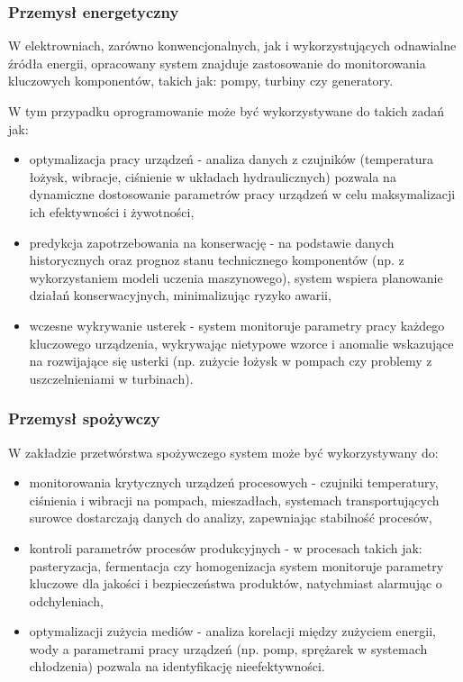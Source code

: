 \subsubsection{Przemysł energetyczny}
\label{subsubsec:przemysl_energetyczny}

W elektrowniach, zarówno konwencjonalnych, jak i wykorzystujących odnawialne źródła energii, opracowany system znajduje zastosowanie do monitorowania kluczowych komponentów, takich jak: pompy, turbiny czy generatory. 

\vspace{0.3em}

W tym przypadku oprogramowanie może być wykorzystywane do takich zadań jak:

\begin{itemize}
    \item optymalizacja pracy urządzeń - analiza danych z czujników (temperatura łożysk, wibracje, ciśnienie w układach hydraulicznych) pozwala na dynamiczne dostosowanie parametrów pracy urządzeń w celu maksymalizacji ich efektywności i żywotności,
    \item predykcja zapotrzebowania na konserwację - na podstawie danych historycznych oraz prognoz stanu technicznego komponentów (np. z wykorzystaniem modeli uczenia maszynowego), system wspiera planowanie działań konserwacyjnych, minimalizując ryzyko awarii,
    \item wczesne wykrywanie usterek - system monitoruje parametry pracy każdego kluczowego urządzenia, wykrywając nietypowe wzorce i anomalie wskazujące na rozwijające się usterki (np. zużycie łożysk w pompach czy problemy z uszczelnieniami w turbinach).
\end{itemize}

\subsubsection{Przemysł spożywczy}
\label{subsubsec:przemysl_spozywczy}

W zakładzie przetwórstwa spożywczego system może być wykorzystywany do:

\vspace{0.3em}

\begin{itemize}
    \item monitorowania krytycznych urządzeń procesowych - czujniki temperatury, ciśnienia i wibracji na pompach, mieszadłach, systemach transportujących surowce dostarczają danych do analizy, zapewniając stabilność procesów,
    \item kontroli parametrów procesów produkcyjnych - w procesach takich jak: pasteryzacja, fermentacja czy homogenizacja system monitoruje parametry kluczowe dla jakości i bezpieczeństwa produktów, natychmiast alarmując o odchyleniach,
    \item optymalizacji zużycia mediów - analiza korelacji między zużyciem energii, wody a parametrami pracy urządzeń (np. pomp, sprężarek w systemach chłodzenia) pozwala na identyfikację nieefektywności.
\end{itemize}

